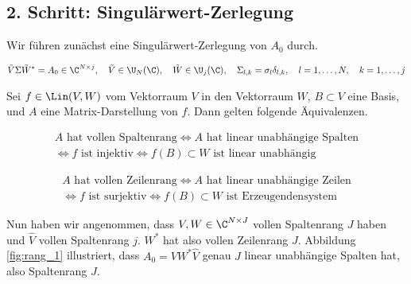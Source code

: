 \subsection*{2. Schritt: Singulärwert-Zerlegung}

Wir führen zunächst eine Singulärwert-Zerlegung von $A_0$ durch.

\begin{align*}
    \tilde V \Sigma \tilde W^\ast = A_0 \in \C^{N \times j},
    \quad
    \tilde V \in \U_N(\C),
    \quad
    \tilde W \in \U_j(\C),
    \quad
    \Sigma_{l, k} = \sigma_l \delta_{l, k},
    \quad
    l = 1, \dots, N,
    \quad
    k = 1, \dots, j
\end{align*}

\begin{remark}

    Sei $f \in \Lin(V, W)$ vom Vektorraum $V$ in den Vektorraum $W$, $B \subset V$ eine Basis, und $A$ eine Matrix-Darstellung von $f$.
    Dann gelten folgende Äquivalenzen.

    \begin{multline*}
        \text{$A$ hat vollen Spaltenrang}
        \iff
        \text{$A$ hat linear unabhängige Spalten} \\
        \iff
        \text{$f$ ist injektiv}
        \iff
        \text{$f(B) \subset W$ ist linear unabhängig}
    \end{multline*}

    \begin{multline*}
        \text{$A$ hat vollen Zeilenrang}
        \iff
        \text{$A$ hat linear unabhängige Zeilen} \\
        \iff
        \text{$f$ ist surjektiv}
        \iff
        \text{$f(B) \subset W$ ist Erzeugendensystem}
    \end{multline*}

\end{remark}


Nun haben wir angenommen, dass $V, W \in \C^{N \times J}$ vollen Spaltenrang $J$ haben und $\hat V$ vollen Spaltenrang $j$.
$W^\ast$ hat also vollen Zeilenrang $J$.
Abbildung \ref{fig:rang_1} illustriert, dass $A_0 = V W^\ast \hat V$ genau $J$ linear unabhängige Spalten hat, also Spaltenrang $J$.

